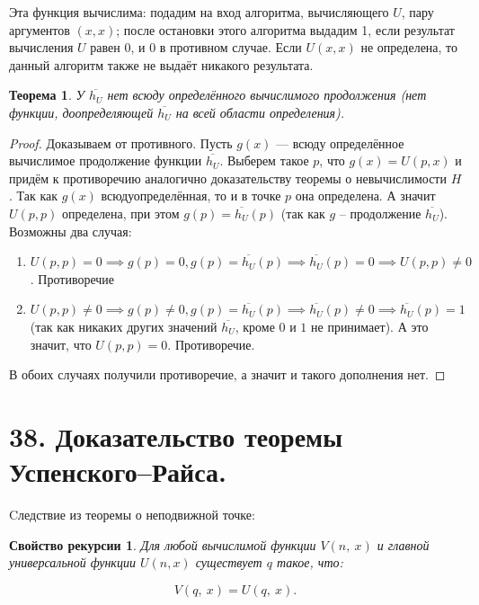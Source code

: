 \documentclass[a4paper, 12pt]{article}
\newtheorem*{rec}{Свойство рекурсии}
\newtheorem*{theorem}{Теорема}
\begin{document}
Эта функция вычислима: подадим на вход алгоритма, вычисляющего $U$, пару аргументов $(x, x)$; после остановки этого алгоритма выдадим 1, если результат вычисления $U$ равен $0$, и $0$ в противном случае. Если $U(x, x)$ не определена, то данный алгоритм также не выдаёт никакого результата.

\begin{theorem}
    У $\overline{h_U}$ нет всюду определённого вычислимого продолжения (нет функции, доопределяющей $\overline{h_U}$ на всей области определения).
\end{theorem}

\begin{proof}
    
    Доказываем от противного. Пусть $g(x)$ --- всюду определённое вычислимое продолжение функции $\overline{h_U}$. Выберем такое $p$, что $g(x) = U(p, x)$ и придём к противоречию аналогично доказательству теоремы о невычислимости $H$. Так как $g(x)$
    всюдуопределённая, то и в точке $p$ она определена. А значит $U(p, p)$ определена, при этом $g(p) = \overline{h_U}(p)$ (так как $g$ -- продолжение $\overline{h_U}$). 
    Возможны два случая:
    \begin{enumerate}
        \item $U(p, p) = 0 \implies g(p) = 0, g(p) = 
        \overline{h_U}(p) \implies 
        \overline{h_U}(p) = 0 \implies
        U(p, p) \neq 0$. Противоречие
        \item $U(p, p) \neq 0 \implies g(p) \neq 0,
        g(p) = \overline{h_U}(p) \implies
        \overline{h_U}(p) \neq 0 \implies
        \overline{h_U}(p) = 1$ (так как никаких других
        значений $\overline{h_U}$, кроме $0$ и $1$ не принимает). А это значит, что $U(p,p) = 0$. 
        Противоречие.
    \end{enumerate}
    
    В обоих случаях получили противоречие, а значит
    и такого дополнения нет.

\end{proof}

\section*{38. Доказательство теоремы Успенского–Райса.}

Cледствие из теоремы о неподвижной точке:

\begin{rec}
    Для любой вычислимой функции $V(n,\ x)$ и главной универсальной
    функции $U(n, x)$ существует $q$ такое, что:

    \[
        V(q,\ x) = U(q,\ x).
    \]

\end{rec}
\end{document}
